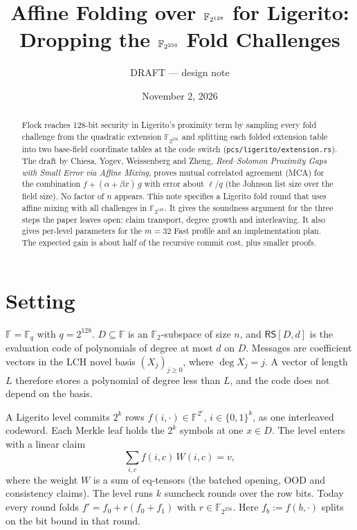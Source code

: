 \documentclass[11pt]{article}
\title{Affine Folding over $\F_{2^{128}}$ for Ligerito:\\
Dropping the $\F_{2^{256}}$ Fold Challenges}
\author{DRAFT --- design note}
\date{November 2, 2026}
\newcommand{\F}{\mathbb{F}}
\newcommand{\RS}{\mathsf{RS}}
\begin{document}
\maketitle

\begin{abstract}
Flock reaches 128-bit security in Ligerito's proximity term by sampling
every fold challenge from the quadratic extension $\F_{2^{256}}$ and
splitting each folded extension table into two base-field coordinate
tables at the code switch (\texttt{pcs/ligerito/extension.rs}). The
draft by Chiesa, Yogev, Weissenberg and Zheng, \emph{Reed--Solomon
Proximity Gaps with Small Error via Affine Mixing}, proves mutual
correlated agreement (MCA) for the combination $f + (\alpha + \beta
x)\,g$ with error about $\ell/q$ (the Johnson list size over the field
size). No factor of $n$ appears. This note specifies a Ligerito fold
round that uses affine mixing with all challenges in $\F_{2^{128}}$. It
gives the soundness argument for the three steps the paper leaves
open: claim transport, degree growth and interleaving. It also gives
per-level parameters for the $m = 32$ Fast profile and an
implementation plan. The expected gain is about half of the recursive
commit cost, plus smaller proofs.
\end{abstract}

\section{Setting}\label{sec:setting}

$\F = \F_q$ with $q = 2^{128}$. $D \subseteq \F$ is an
$\F_2$-subspace of size $n$, and $\RS[D, d]$ is the evaluation code of
polynomials of degree at most $d$ on $D$. Messages are coefficient
vectors in the LCH novel basis $(X_j)_{j \ge 0}$, where $\deg X_j = j$.
A vector of length $L$ therefore stores a polynomial of degree less
than $L$, and the code does not depend on the basis.

A Ligerito level commits $2^k$ rows $f(i, \cdot) \in \F^{2^c}$, $i \in
\{0,1\}^k$, as one interleaved codeword. Each Merkle leaf holds the
$2^k$ symbols at one $x \in D$. The level enters with a linear claim
\begin{equation}\label{eq:claim}
  \textstyle\sum_{i, c} f(i, c)\, W(i, c) = v,
\end{equation}
where the weight $W$ is a sum of eq-tensors (the batched opening,
OOD and consistency claims). The level runs $k$ sumcheck rounds over
the row bits. Today every round folds $f' = f_0 + r(f_0 + f_1)$ with
$r \in \F_{2^{256}}$. Here $f_b := f(b, \cdot)$ splits on the bit
bound in that round.
\end{document}

